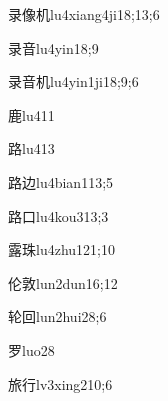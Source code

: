 \begin{verbete}{录像机}{lu4xiang4ji1}{8;13;6}
\end{verbete}

\begin{verbete}{录音}{lu4yin1}{8;9}
\end{verbete}

\begin{verbete}{录音机}{lu4yin1ji1}{8;9;6}
\end{verbete}

\begin{verbete}{鹿}{lu4}{11}
\end{verbete}

\begin{verbete}{路}{lu4}{13}
\end{verbete}

\begin{verbete}{路边}{lu4bian1}{13;5}
\end{verbete}

\begin{verbete}{路口}{lu4kou3}{13;3}
\end{verbete}

\begin{verbete}{露珠}{lu4zhu1}{21;10}
\end{verbete}

\begin{verbete}{伦敦}{lun2dun1}{6;12}
\end{verbete}

\begin{verbete}{轮回}{lun2hui2}{8;6}
\end{verbete}

\begin{verbete}{罗}{luo2}{8}
\end{verbete}

\begin{verbete}{旅行}{lv3xing2}{10;6}
\end{verbete}

